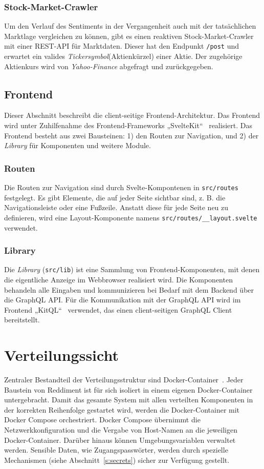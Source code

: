 \documentclass[a4paper, 10pt, conference]{IEEEtran}
\begin{document}
\subsubsection{Stock-Market-Crawler}

Um den Verlauf des Sentiments in der Vergangenheit auch mit der tatsächlichen Marktlage vergleichen zu können,
gibt es einen reaktiven Stock-Market-Crawler mit einer REST-API für Marktdaten. Dieser hat den Endpunkt \texttt{/post} und erwartet ein valides \textit{Tickersymbol}(Aktienkürzel) einer Aktie. Der zugehörige Aktienkurs wird von \textit{Yahoo-Finance} abgefragt und zurückgegeben.

\subsection{Frontend} \label{sub:frontend}
Dieser Abschnitt beschreibt die client-seitige Frontend-Architektur. Das Frontend wird unter Zuhilfenahme des Frontend-Frameworks „SvelteKit“~\cite{sveltekit} realisiert. Das Frontend besteht aus zwei Bausteinen: 1) den Routen zur Navigation, und 2) der \textit{Library} für Komponenten und weitere Module.

\subsubsection{Routen}

Die Routen zur Navigation sind durch Svelte-Kompontenen in \texttt{src/routes} festgelegt. Es gibt Elemente, die auf jeder Seite sichtbar sind, z. B. die Navigationsleiste oder eine Fußzeile. Anstatt diese für jede Seite neu zu definieren,  wird eine Layout-Komponente namens \texttt{src/routes/\_\_layout.svelte} verwendet.

\subsubsection{Library}

Die \textit{Library} (\texttt{src/lib}) ist eine Sammlung von Frontend-Komponenten,  mit denen die eigentliche Anzeige im Webbrowser realisiert wird. Die Komponenten behandeln alle Eingaben und kommunizieren bei Bedarf mit dem Backend über die GraphQL API. Für die Kommunikation mit der GraphQL API wird im Frontend „KitQL“~\cite{kitql} verwendet, das einen client-seitigen GraphQL Client bereitstellt.

\section{Verteilungssicht} \label{s:verteilungssicht}
Zentraler Bestandteil der Verteilungsstruktur sind Docker-Container~\cite{docker}. Jeder Baustein von Reddiment ist für sich isoliert in einem eigenen Docker-Container untergebracht.
Damit das gesamte System mit allen verteilten Komponenten in der korrekten Reihenfolge gestartet wird, werden die Docker-Container mit Docker Compose orchestriert.
Docker Compose übernimmt die Netzwerkkonfiguration und die Vergabe von Host-Namen an die jeweiligen Docker-Container.
Darüber hinaus können Umgebungsvariablen verwaltet werden. Sensible Daten, wie Zugangspasswörter, werden durch spezielle Mechanismen (siehe Abschnitt~\ref{s:secrets}) sicher zur Verfügung gestellt.
\end{document}
